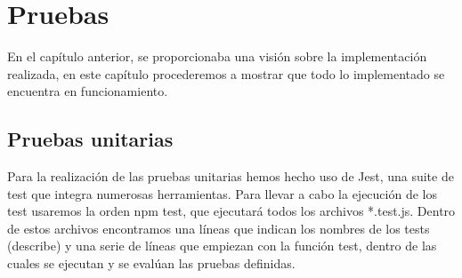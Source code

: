 \chapter{Pruebas}

En el capítulo anterior, se proporcionaba una visión sobre la implementación realizada, en este capítulo procederemos a mostrar que todo lo implementado se encuentra en funcionamiento.

\section {Pruebas unitarias}
Para la realización de las pruebas unitarias hemos hecho uso de Jest, una suite de test que integra numerosas herramientas. Para llevar a cabo la ejecución de los test usaremos la orden npm test, que ejecutará todos los archivos *.test.js. Dentro de estos archivos encontramos una líneas que indican los nombres de los tests (describe) y una serie de líneas que empiezan con la función test, dentro de las cuales se ejecutan y se evalúan las pruebas definidas.

